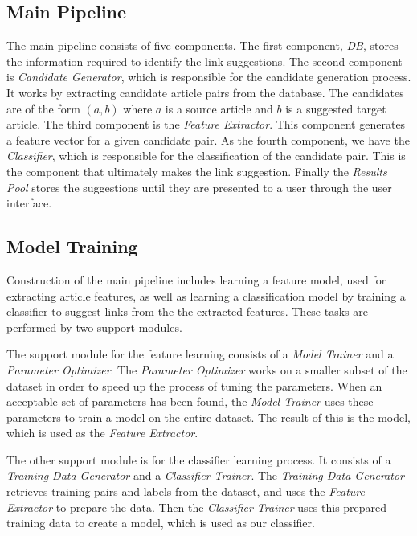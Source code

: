 \subsection{Main Pipeline}
The main pipeline consists of five components. The first component, \emph{DB}, stores the information required to identify the link suggestions. The second component is \emph{Candidate Generator}, which is responsible for the candidate generation process. It works by extracting candidate article pairs from the database. The candidates are of the form $(a,b)$ where $a$ is a source article and $b$ is a suggested target article. The third component is the \emph{Feature Extractor}. This component generates a feature vector for a given candidate pair. As the fourth component, we have the \emph{Classifier}, which is responsible for the classification of the candidate pair. This is the component that ultimately makes the link suggestion. Finally the \emph{Results Pool} stores the suggestions until they are presented to a user through the user interface.

\subsection{Model Training}
Construction of the main pipeline includes learning a feature model, used for extracting article features, as well as learning a classification model by training a classifier to suggest links from the the extracted features. These tasks are performed by two support modules.

The support module for the feature learning consists of a \emph{Model Trainer} and a \emph{Parameter Optimizer}. The \emph{Parameter Optimizer} works on a smaller subset of the dataset in order to speed up the process of tuning the parameters. When an acceptable set of parameters has been found, the \emph{Model Trainer} uses these parameters to train a model on the entire dataset. The result of this is the model, which is used as the \emph{Feature Extractor}.

The other support module is for the classifier learning process. It consists of a \emph{Training Data Generator} and a \emph{Classifier Trainer}. The \emph{Training Data Generator} retrieves training pairs and labels from the dataset, and uses the \emph{Feature Extractor} to prepare the data. Then the \emph{Classifier Trainer} uses this prepared training data to create a model, which is used as our classifier.

